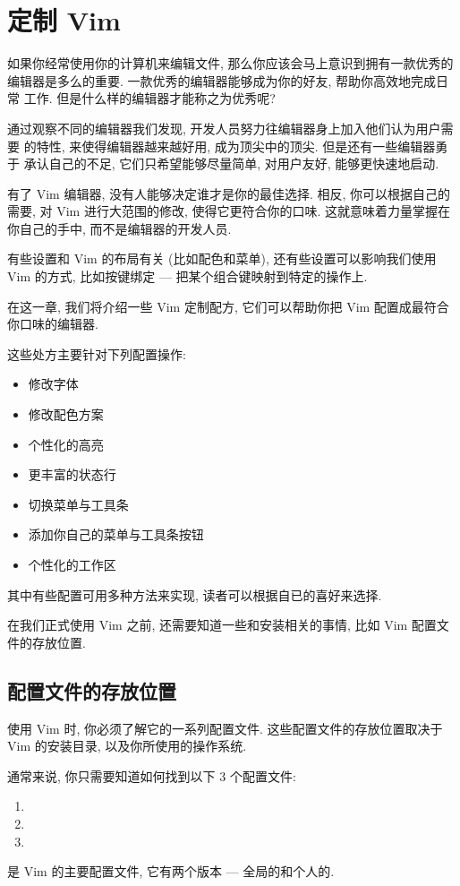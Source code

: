 \chapter{定制 Vim}
\label{chap:personalizing_vim}
如果你经常使用你的计算机来编辑文件, 那么你应该会马上意识到拥有一款优秀的
编辑器是多么的重要. 一款优秀的编辑器能够成为你的好友, 帮助你高效地完成日常
工作. 但是什么样的编辑器才能称之为优秀呢?

通过观察不同的编辑器我们发现, 开发人员努力往编辑器身上加入他们认为用户需要
的特性, 来使得编辑器越来越好用, 成为顶尖中的顶尖.  但是还有一些编辑器勇于
承认自己的不足, 它们只希望能够尽量简单, 对用户友好, 能够更快速地启动.

有了 Vim 编辑器, 没有人能够决定谁才是你的最佳选择. 相反, 你可以根据自己的
需要, 对 Vim 进行大范围的修改, 使得它更符合你的口味. 这就意味着力量掌握在
你自己的手中, 而不是编辑器的开发人员.

有些设置和 Vim 的布局有关 (比如配色和菜单), 还有些设置可以影响我们使用
Vim 的方式, 比如按键绑定 --- 把某个组合键映射到特定的操作上.

在这一章, 我们将介绍一些 Vim 定制配方, 它们可以帮助你把 Vim 配置成最符合
你口味的编辑器.

这些处方主要针对下列配置操作:
\begin{itemize}
    \item 修改字体
    \item 修改配色方案
    \item 个性化的高亮
    \item 更丰富的状态行
    \item 切换菜单与工具条
    \item 添加你自己的菜单与工具条按钮
    \item 个性化的工作区
\end{itemize}
其中有些配置可用多种方法来实现, 读者可以根据自已的喜好来选择.

在我们正式使用 Vim 之前, 还需要知道一些和安装相关的事情, 比如 Vim
配置文件的存放位置.

\section{配置文件的存放位置}
\label{sec:where_the_configuration_files}
使用 Vim 时, 你必须了解它的一系列配置文件. 这些配置文件的存放位置取决于
Vim 的安装目录, 以及你所使用的操作系统.

通常来说, 你只需要知道如何找到以下 3 个配置文件:
\begin{enumerate}
    \item {}
    \item {}
    \item {}
\end{enumerate}
 是 Vim 的主要配置文件, 它有两个版本 --- 全局的和个人的.

